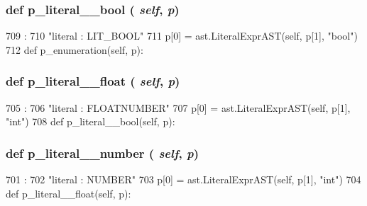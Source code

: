 \begin{DoxyVerb}
{\subsubsection[{p\_\-literal\_\-\_\-bool}]{\setlength{\rightskip}{0pt plus 5cm}def p\_\-literal\_\-\_\-bool ( {\em self}, \/   {\em p})}}
\label{classslicc_1_1parser_1_1SLICC_ab0a9703c95e703c1e2664fd532e19951}



\begin{DoxyCode}
709                                 :
710         "literal : LIT_BOOL"
711         p[0] = ast.LiteralExprAST(self, p[1], "bool")
712 
    def p_enumeration(self, p):
\end{DoxyCode}
\hypertarget{classslicc_1_1parser_1_1SLICC_a96dd60ba8acf634524837855abefeebb}{
\subsubsection[{p\_\-literal\_\-\_\-float}]{\setlength{\rightskip}{0pt plus 5cm}def p\_\-literal\_\-\_\-float ( {\em self}, \/   {\em p})}}
\label{classslicc_1_1parser_1_1SLICC_a96dd60ba8acf634524837855abefeebb}



\begin{DoxyCode}
705                                  :
706         "literal : FLOATNUMBER"
707         p[0] = ast.LiteralExprAST(self, p[1], "int")
708 
    def p_literal__bool(self, p):
\end{DoxyCode}
\hypertarget{classslicc_1_1parser_1_1SLICC_a7461ee14365de567c127d4ab8945d4b1}{
\subsubsection[{p\_\-literal\_\-\_\-number}]{\setlength{\rightskip}{0pt plus 5cm}def p\_\-literal\_\-\_\-number ( {\em self}, \/   {\em p})}}
\label{classslicc_1_1parser_1_1SLICC_a7461ee14365de567c127d4ab8945d4b1}



\begin{DoxyCode}
701                                   :
702         "literal : NUMBER"
703         p[0] = ast.LiteralExprAST(self, p[1], "int")
704 
    def p_literal__float(self, p):
\end{DoxyCode}
\hypertarget{classslicc_1_1parser_1_1SLICC_afb56a210832d7241c7b30a71208f3e78}{
}
\end{DoxyVerb}
